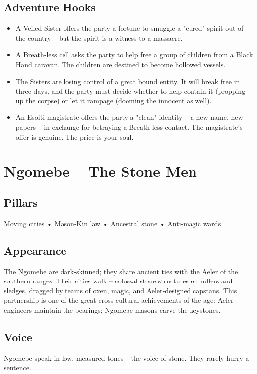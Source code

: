 \documentclass[11pt]{book}
\begin{document}
\subsection*{Adventure Hooks}
\begin{itemize}
\item A Veiled Sister offers the party a fortune to smuggle a "cured" spirit out of the country -- but the spirit is a witness to a massacre.
\item A Breath‑less cell asks the party to help free a group of children from a Black Hand caravan. The children are destined to become hollowed vessels.
\item The Sisters are losing control of a great bound entity. It will break free in three days, and the party must decide whether to help contain it (propping up the corpse) or let it rampage (dooming the innocent as well).
\item An Esoiti magistrate offers the party a "clean" identity -- a new name, new papers -- in exchange for betraying a Breath‑less contact. The magistrate's offer is genuine. The price is your soul.
\end{itemize}

\section{Ngomebe -- The Stone Men}

\subsection*{Pillars}
Moving cities • Mason‑Kin law • Ancestral stone • Anti‑magic wards

\subsection*{Appearance}
The Ngomebe are dark‑skinned; they share ancient ties with the Aeler of the southern ranges. Their cities walk -- colossal stone structures on rollers and sledges, dragged by teams of oxen, magic, and Aeler‑designed capstans. This partnership is one of the great cross‑cultural achievements of the age: Aeler engineers maintain the bearings; Ngomebe masons carve the keystones.

\subsection*{Voice}
Ngomebe speak in low, measured tones -- the voice of stone. They rarely hurry a sentence.
\end{document}
